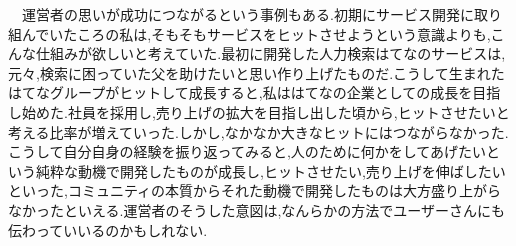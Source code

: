 \documentclass[uplatex,twocolumn,dvipdfmx]{jsarticle}
\begin{document}
　運営者の思いが成功につながるという事例もある.初期にサービス開発に取り組んでいたころの私は,そもそもサービスをヒットさせようという意識よりも,こんな仕組みが欲しいと考えていた.最初に開発した人力検索はてなのサービスは,元々,検索に困っていた父を助けたいと思い作り上げたものだ.こうして生まれたはてなグループがヒットして成長すると,私ははてなの企業としての成長を目指し始めた.社員を採用し,売り上げの拡大を目指し出した頃から,ヒットさせたいと考える比率が増えていった.しかし,なかなか大きなヒットにはつながらなかった.こうして自分自身の経験を振り返ってみると,人のために何かをしてあげたいという純粋な動機で開発したものが成長し,ヒットさせたい,売り上げを伸ばしたいといった,コミュニティの本質からそれた動機で開発したものは大方盛り上がらなかったといえる.運営者のそうした意図は,なんらかの方法でユーザーさんにも伝わっていいるのかもしれない.\nocite{kondou}


\end{document}
